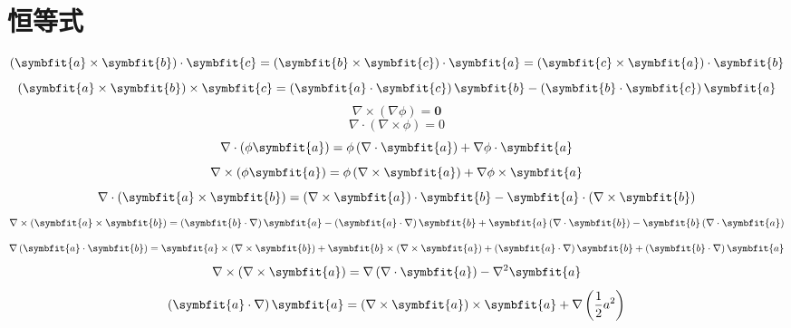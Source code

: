 \section{恒等式}
%
\begin{equation}
\left( \symbfit{a} \times \symbfit{b} \right) \cdot \symbfit{c}
=
\left( \symbfit{b} \times \symbfit{c} \right) \cdot \symbfit{a}
=
\left( \symbfit{c} \times \symbfit{a} \right) \cdot \symbfit{b}
\end{equation}
%
\begin{equation}
\left( \symbfit{a} \times \symbfit{b} \right) \times \symbfit{c}
=
\left( \symbfit{a} \cdot \symbfit{c} \right)  \symbfit{b}
-
\left( \symbfit{b} \cdot \symbfit{c} \right)  \symbfit{a}
\end{equation}
%
\begin{equation}
\nabla \times \left( \nabla \phi \right)
=
\symbf{0}
\end{equation}
%
\begin{equation}
\nabla \cdot \left( \nabla \times \phi \right)
=
0
\end{equation}
%
\begin{equation}
\nabla \cdot \left( \phi \symbfit{a} \right)
=
\phi \left( \nabla \cdot \symbfit{a} \right)
+
\nabla \phi \cdot \symbfit{a}
\end{equation}
%
\begin{equation}
\nabla \times \left( \phi \symbfit{a} \right)
=
\phi \left( \nabla \times \symbfit{a} \right)
+
\nabla \phi \times \symbfit{a}
\end{equation}
%
\begin{equation}
\nabla \cdot \left( \symbfit{a} \times \symbfit{b} \right)
=
\left( \nabla \times \symbfit{a} \right) \cdot \symbfit{b}
-
\symbfit{a} \cdot  \left( \nabla \times \symbfit{b} \right)
\end{equation}
%
\begin{equation}
\nabla \times \left( \symbfit{a} \times \symbfit{b} \right)
=
\left( \symbfit{b} \cdot \nabla \right) \symbfit{a}
-
\left( \symbfit{a} \cdot \nabla \right) \symbfit{b}
+
\symbfit{a} \left( \nabla \cdot \symbfit{b} \right)
-
\symbfit{b} \left( \nabla \cdot \symbfit{a} \right)
\end{equation}
%
\begin{equation}
\nabla \left( \symbfit{a} \cdot \symbfit{b} \right)
=
\symbfit{a} \times \left( \nabla \times \symbfit{b} \right)
+
\symbfit{b} \times \left( \nabla \times \symbfit{a} \right)
+
\left( \symbfit{a} \cdot \nabla \right) \symbfit{b}
+
\left( \symbfit{b} \cdot \nabla \right) \symbfit{a}
\end{equation}
%
\begin{equation}
\nabla \times \left( \nabla \times \symbfit{a} \right)
=
\nabla \left( \nabla \cdot \symbfit{a} \right)
-
\nabla^2 \symbfit{a}
\end{equation}
%
\begin{equation}\label{}
\left( \symbfit{a} \cdot \nabla \right) \symbfit{a}
=
\left( \nabla \times \symbfit{a} \right) \times \symbfit{a}
+
\nabla \left( \frac{1}{2} a^2 \right)
\end{equation}
%
